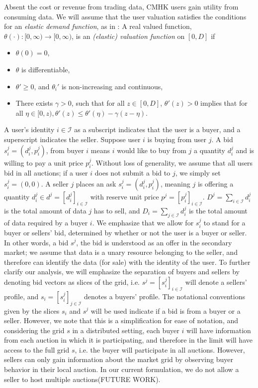 \documentclass[12pt]{article}
\theoremstyle{definition}
\newcommand{\mcI}{\mathcal{I}}
\begin{document}
\begin{multicols}{2}
Absent the cost or revenue from trading data, CMHK users gain utility from consuming
data. 
We will assume that the user valuation satisfies the conditions for an
\emph{elastic demand function}, as in \cite{lazar}: 
A real valued function, $\theta(\cdot): [0,\infty) \rightarrow [0,\infty)$, is an \emph{(elastic) valuation
function} on $[0, D]$ if 
\begin{itemize}
    \item $\theta(0) = 0$,
    \item $\theta$ is differentiable,
    \item ${\theta}' \ge 0$, and ${\theta_i}'$ is non-increasing and continuous,
     \item There exists $\gamma > 0$, such that for all $z \in [0,D]$,
${\theta}'(z) > 0$ implies that for all $\eta \in [0, z), {\theta}'(z) \le
{\theta}'(\eta)
- \gamma(z - \eta)$. 
\end{itemize}
A user's identity $i \in \mcI$ as a subscript indicates that the user
is a buyer, and a superscript indicates the seller.
Suppose user $i$ is buying from user $j$. A bid $s_i^j = (d_i^j, p_i^j)$, from
buyer $i$
means $i$ would like to buy from $j$ a quantity $d^j_i$ and is willing to pay
a unit price $p^j_i$. Without loss of generality, we assume that all users bid in all
auctions; if a user $i$ does not submit a bid to $j$, we simply set $s_i^j = (0,0)$.
A seller $j$ places an ask $s_i^j = (d_i^j, p_i^j)$, meaning $j$ is offering a
quantity $d_i^j \in d^j = [d_i^j]_{i\in\mcI}$ 
with reserve unit price $p^j = [p_i^j]_{i\in\mcI}$. $D^j = \sum_{i\in\mcI}
d_i^j$ is the total amount of data $j$ has to sell, and $D_i = \sum_{j\in\mcI} d_i^j$ is the
total amount of data required by a buyer $i$. 
We emphasize that we allow for $s_i^j$ to
stand for a buyer or sellers' bid, determined by whether or not the user is a
buyer or seller. In other words, a bid $s^j$, the bid is understood as an offer in the secondary
market; we assume that data is a unary resource belonging to the seller, and
therefore can identify the data (for sale) with the identity of the user.
To further clarify our analysis, we will emphasize the separation of buyers and
sellers by denoting bid vectors as slices of the
grid, i.e. $s^j = [s_i^j]_{i\in\mcI}$ will denote a sellers' profile, and  $s_i =
[s_i^j]_{j\in\mcI}$ denotes a buyers' profile. 
The notational conventions given by the slices $s_i$
and $s^j$ will be used indicate if a bid is from a buyer or a seller. However,
we note that this is a simplification for ease of notation, and considering the
grid $s$ in a distributed setting, each buyer $i$ will
have information from each auction in which it is participating, and therefore
in the limit will have access to the full grid $s$, i.e. the buyer will
participate in all auctions. However, 
sellers can only gain information about the market grid by observing buyer
behavior in their local auction.
In our current formulation, we do not allow a seller to host multiple auctions(FUTURE WORK).


\end{multicols}
\end{document}
